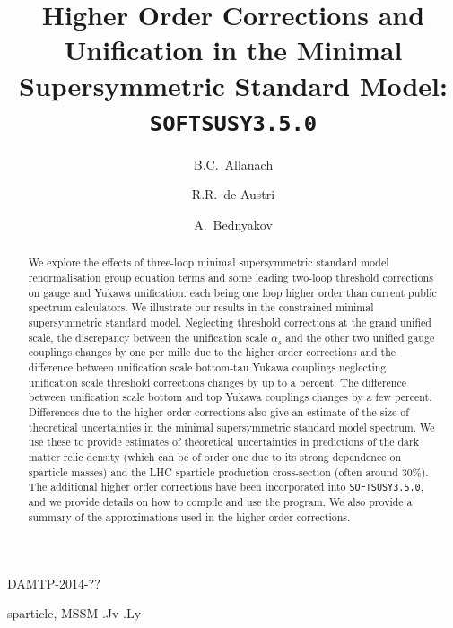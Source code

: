 \documentclass[final,3p,times,pdflatex]{elsarticle}
\begin{document}
\begin{frontmatter}

\begin{flushright}
DAMTP-2014-??
\end{flushright}

\title{Higher Order Corrections and Unification in
  the Minimal Supersymmetric Standard Model: {\tt SOFTSUSY3.5.0}}

\author[damtp]{B.C.~Allanach}
\author[valencia]{R.R.~de Austri}
\author[dunba]{A.~Bednyakov}

\address[damtp]{DAMTP, CMS, University of Cambridge, Wilberforce road,
  Cambridge, CB3  0WA, United Kingdom}
\address[valencia]{Instituto de Física Corpuscular | Parque Científico,
  C/Catedrático José Beltrán, 2 | E-46980 Paterna, Spain} 
\address[dubna]{Joint Institute for Nuclear Research, 141980, Dubna, Russia}

\begin{abstract}
  We explore the effects of three-loop minimal supersymmetric standard
  model   renormalisation group equation terms and some leading two-loop
  threshold corrections on gauge and Yukawa
  unification: each being one loop higher order than 
  current public spectrum calculators.
  We illustrate our results in the constrained minimal supersymmetric standard
  model. Neglecting threshold corrections at the grand unified scale, the
  discrepancy between the unification scale
  $\alpha_s$ and 
  the other two unified gauge couplings changes by one per mille due to the
  higher order 
  corrections and
  the difference between unification scale bottom-tau
  Yukawa couplings neglecting unification scale threshold
  corrections changes by up to a percent. The difference between unification
  scale bottom and top Yukawa couplings changes by a few percent.
  Differences due to the higher order corrections also give an estimate of the
  size of theoretical uncertainties in the minimal supersymmetric standard
  model spectrum. We use these to 
  provide   estimates 
  of theoretical uncertainties in predictions of the dark matter relic density
  (which can be of order one due to its strong dependence on sparticle masses)
  and the LHC sparticle production cross-section (often around 30$\%$).
  The additional higher order corrections have been
  incorporated into {\tt SOFTSUSY3.5.0}, and we provide details on how to
  compile and use the program. We also provide a summary of the
  approximations used in the higher order corrections. 
\end{abstract}

\begin{keyword}
sparticle, 
MSSM
.Jv
.Ly
\end{keyword}
\end{frontmatter}
\end{document}
